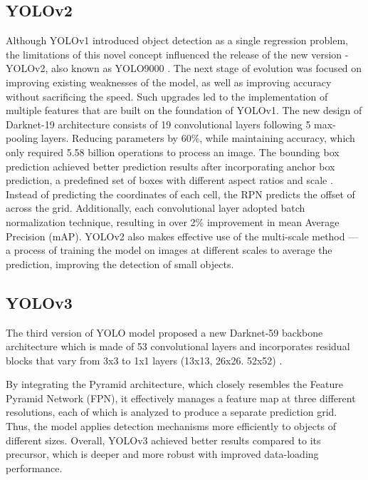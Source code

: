 \begin{multicols}{2}
\subsection{YOLOv2}
Although YOLOv1 introduced object detection as a single regression problem, the limitations of this novel concept influenced the release of the new version - YOLOv2, also known as YOLO9000 \citep{8100173}. The next stage of evolution was focused on improving existing weaknesses of the model, as well as improving accuracy without sacrificing the speed. Such upgrades led to the implementation of multiple features that are built on the foundation of YOLOv1. The new design of Darknet-19 architecture consists of 19 convolutional layers following 5 max-pooling layers. Reducing parameters by 60\%, while maintaining accuracy, which only required 5.58 billion operations to process an image. The bounding box prediction achieved better prediction results after incorporating anchor box prediction, a predefined set of boxes with different aspect ratios and scale \citep{Roboflow2023}. Instead of predicting the coordinates of each cell, the RPN predicts the offset of across the grid. Additionally, each convolutional layer adopted batch normalization technique, resulting in over 2\% improvement in mean Average Precision (mAP). YOLOv2 also makes effective use of the multi-scale method — a process of training the model on images at different scales to average the prediction, improving the detection of small objects.



\subsection{YOLOv3}
The third version of YOLO model proposed a new Darknet-59 backbone architecture which is made of 53 convolutional layers and incorporates residual blocks that vary from 3x3 to 1x1 layers (13x13, 26x26. 52x52) \citep{redmon2018yolov3, Neuralception2023}. 

By integrating the Pyramid architecture, which closely resembles the Feature Pyramid Network (FPN), it effectively manages a feature map at three different resolutions, each of which is analyzed to produce a separate prediction grid. Thus, the model applies detection mechanisms more efficiently to objects of different sizes. Overall, YOLOv3 achieved better results compared to its precursor, which is deeper and more robust with improved data-loading performance.


\end{multicols}
